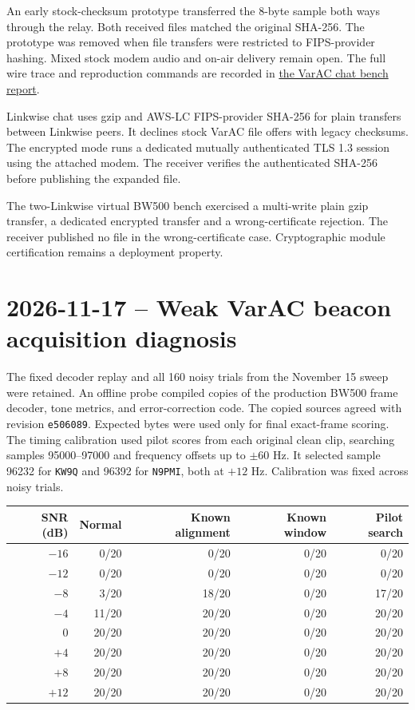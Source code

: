 \documentclass[11pt,a4paper]{article}
\begin{document}
An early stock-checksum prototype transferred the 8-byte sample
both ways through the relay. Both received files matched the original
SHA-256. The prototype was removed when file transfers were restricted
to FIPS-provider hashing. Mixed stock modem audio and on-air delivery
remain open. The full wire trace and reproduction
commands are recorded in \href{../docs/testing/varac-chat.md}{the
VarAC chat bench report}.

Linkwise chat uses gzip and AWS-LC FIPS-provider SHA-256 for
plain transfers between Linkwise peers. It declines stock VarAC file
offers with legacy checksums. The encrypted mode runs a dedicated
mutually authenticated TLS 1.3 session using the attached modem. The receiver verifies the
authenticated SHA-256 before publishing the expanded file.

The two-Linkwise virtual BW500 bench exercised a multi-write plain
gzip transfer, a dedicated encrypted transfer and a wrong-certificate
rejection. The receiver published no file in the wrong-certificate
case. Cryptographic module certification remains a deployment property.

\clearpage
\section{2026-11-17 -- Weak VarAC beacon acquisition diagnosis}

The fixed decoder replay and all 160 noisy trials from the November 15
sweep were retained. An offline probe compiled copies of the production
BW500 frame decoder, tone metrics, and error-correction code. The copied
sources agreed with revision \texttt{e506089}. Expected bytes were used
only for final exact-frame scoring. The timing calibration used pilot
scores from each original clean clip, searching samples 95000--97000
and frequency offsets up to $\pm60$ Hz. It selected sample 96232 for
\texttt{KW9Q} and 96392 for \texttt{N9PMI}, both at $+12$ Hz.
Calibration was fixed across noisy trials.

\begin{center}
\begin{tabular}{@{}rrrrr@{}}
\toprule
SNR (dB) & Normal & Known alignment & Known window & Pilot search \\
\midrule
$-16$ & 0/20 & 0/20 & 0/20 & 0/20 \\
$-12$ & 0/20 & 0/20 & 0/20 & 0/20 \\
$-8$ & 3/20 & 18/20 & 0/20 & 17/20 \\
$-4$ & 11/20 & 20/20 & 0/20 & 20/20 \\
$0$ & 20/20 & 20/20 & 0/20 & 20/20 \\
$+4$ & 20/20 & 20/20 & 0/20 & 20/20 \\
$+8$ & 20/20 & 20/20 & 0/20 & 20/20 \\
$+12$ & 20/20 & 20/20 & 0/20 & 20/20 \\
\bottomrule
\end{tabular}
\end{center}
\end{document}
